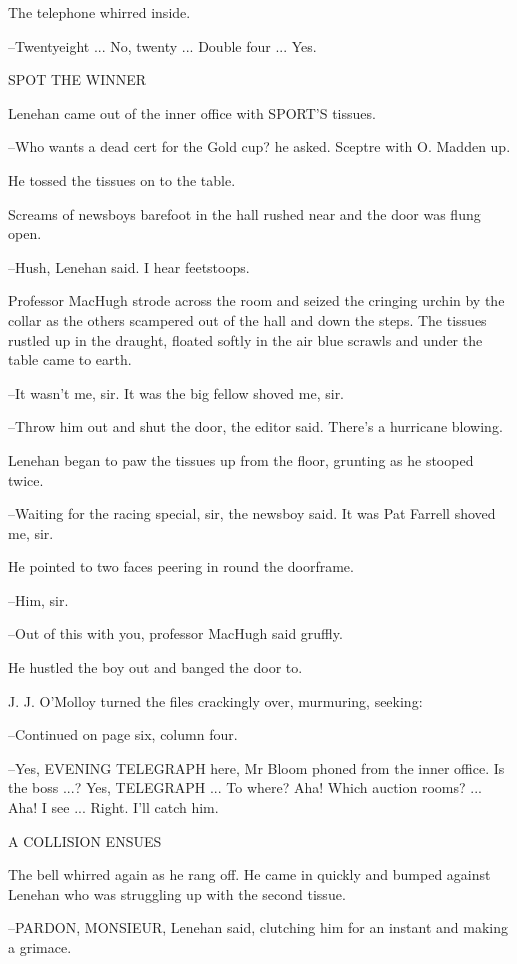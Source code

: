 The telephone whirred inside.

--Twentyeight ... No, twenty ... Double four ... Yes.


    SPOT THE WINNER


Lenehan came out of the inner office with SPORT'S tissues.

--Who wants a dead cert for the Gold cup? he asked. Sceptre with O.
Madden up.

He tossed the tissues on to the table.

Screams of newsboys barefoot in the hall rushed near and the door
was flung open.

--Hush, Lenehan said. I hear feetstoops.

Professor MacHugh strode across the room and seized the cringing
urchin by the collar as the others scampered out of the hall and down the
steps. The tissues rustled up in the draught, floated softly in the air
blue scrawls and under the table came to earth.

--It wasn't me, sir. It was the big fellow shoved me, sir.

--Throw him out and shut the door, the editor said. There's a hurricane
blowing.

Lenehan began to paw the tissues up from the floor, grunting as he
stooped twice.

--Waiting for the racing special, sir, the newsboy said. It was Pat
Farrell shoved me, sir.

He pointed to two faces peering in round the doorframe.

--Him, sir.

--Out of this with you, professor MacHugh said gruffly.

He hustled the boy out and banged the door to.

J. J. O'Molloy turned the files crackingly over, murmuring, seeking:

--Continued on page six, column four.

--Yes, EVENING TELEGRAPH here, Mr Bloom phoned from the inner office. Is
the boss ...? Yes, TELEGRAPH ... To where? Aha! Which auction rooms? ...
Aha! I see ... Right. I'll catch him.


    A COLLISION ENSUES


The bell whirred again as he rang off. He came in quickly and
bumped against Lenehan who was struggling up with the second tissue.

--PARDON, MONSIEUR, Lenehan said, clutching him for an instant and making
a grimace.

